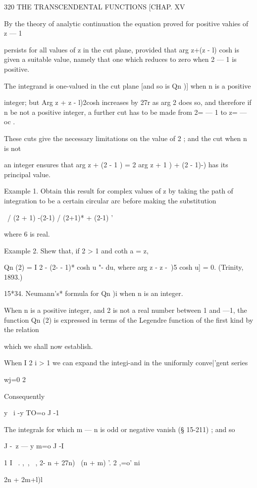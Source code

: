{{320 THE TRANSCENDENTAL FUNCTIONS [CHAP. XV 

By the theory of analytic continuation the equation proved for positive vahies of z — 1 

persists for all values of z in the cut plane, provided that arg  z+(z - l) cosh   is given 
a suitable value, namely that one which reduces to zero when 2 — 1 is positive. 

The integrand is one-valued in the cut plane [and so is Qn  )] when n is a positive 

integer; but Arg  z +  z - l)2cosh   increases by 27r as arg 2 does so, and therefore if n be 
not a positive integer, a further cut has to be made from 2= — 1 to z= — oc . 

These cuts give the necessary limitations on the value of 2 ; and the cut when n is not 

an integer ensures that arg  z + (2  - 1 )   = 2 arg   z + 1 )  + (2 - 1)-) has its principal value. 

Example 1. Obtain this result for complex values of z by taking the path of 
integration to be a certain circular arc before making the substitution 

 \ / (2 + 1)  -(2-1)  
/ (2+1)* + (2-1) ' 

where 6 is real. 

Example 2. Shew that, if 2 > 1 and coth a = z, 

Qn (2) = I  2 - (2- - 1)* cosh u "- du, 
where arg  z - z -\ )5 cosh u] = 0. (Trinity, 1893.) 

15*34. Neumann's* formula for Qn  )i when n is an integer. 

When n is a positive integer, and 2 is not a real number between 1 and —1, the 
function Qn (2) is expressed in terms of the Legendre function of the first kind by the 
relation 

which we shall now establish. 

When I 2 i > 1 we can expand the integi-and in the uniformly conve|'gent series 



wj=0 2 

Consequently 

 y \ i  -y   TO=o J -1 

The integrals for which m — n is odd or negative vanish (§ 15-211) ; and so 

  J -\ z — y   m=o J -I 

 1 I \ . ,\ ,  \ , 2- n + 27n) \ (n + m) '. 
2 ,=o' ni\ \ {2n + 2m+l)l 

}}}
